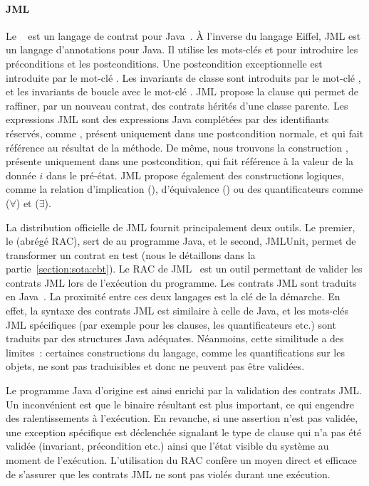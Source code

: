 \paragraph{JML} Le ~ est un langage
de contrat pour Java~. À l'inverse du langage Eiffel, JML est un
langage d'annotations pour Java. Il utilise les mots-clés  et
 pour introduire les préconditions et les postconditions. Une
postcondition exceptionnelle est introduite par le mot-clé . Les
invariants de classe sont introduits par le mot-clé , et les
invariants de boucle avec le mot-clé . JML propose la
clause  qui permet de raffiner, par un nouveau contrat, des contrats
hérités d'une classe parente. Les expressions JML sont des expressions Java
complétées par des identifiants réservés, comme \aresult, présent uniquement
dans une postcondition normale, et qui fait référence au résultat de la méthode.
De même, nous trouvons la construction , présente uniquement dans une
postcondition, qui fait référence à la valeur de la donnée $i$ dans le pré-état.
JML propose également des constructions logiques, comme la relation
d'implication (\code{==>}), d'équivalence (\code{<==>}) ou des quantificateurs
comme  ($\forall$) et  ($\exists$).

La distribution officielle de JML fournit principalement deux outils.  Le
premier, le  (abrégé RAC), sert de
 au programme Java, et le second, JMLUnit, permet de
transformer un contrat en test (nous le détaillons dans la
partie~\ref{section:sota:cbt}). Le RAC de JML~ est un outil
permettant de valider les contrats JML lors de l'exécution du programme. Les
contrats JML sont traduits en Java~. La proximité entre ces
deux langages est la clé de la démarche. En effet, la syntaxe des contrats JML
est similaire à celle de Java, et les mots-clés JML spécifiques (par exemple
pour les clauses, les quantificateurs etc.) sont traduits par des structures
Java adéquates.  Néanmoins, cette similitude a des limites~: certaines
constructions du langage, comme les quantifications sur les objets, ne sont pas
traduisibles et donc ne peuvent pas être validées.

Le programme Java d'origine est ainsi enrichi par la validation des contrats
JML. Un inconvénient est que le binaire résultant est plus important, ce qui
engendre des ralentissements à l'exécution. En revanche, si une assertion n'est
pas validée, une exception spécifique est déclenchée signalant le type de clause
qui n'a pas été validée (invariant, précondition etc.) ainsi que l'état visible
du système au moment de l'exécution. L'utilisation du RAC confère un moyen
direct et efficace de s'assurer que les contrats JML ne sont pas violés durant
une exécution.

